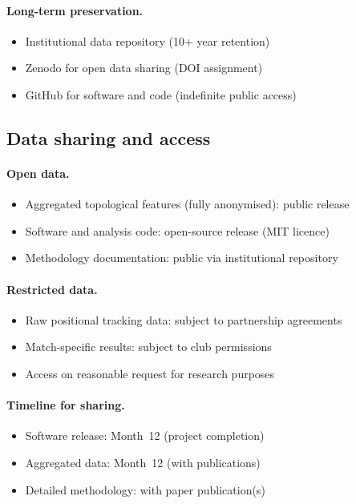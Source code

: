 \paragraph{Long-term preservation.}
\begin{itemize}
  \item Institutional data repository (10+ year retention)
  \item Zenodo for open data sharing (DOI assignment)
  \item GitHub for software and code (indefinite public access)
\end{itemize}

\subsection{Data sharing and access}

\paragraph{Open data.}
\begin{itemize}
  \item Aggregated topological features (fully anonymised): public release
  \item Software and analysis code: open-source release (MIT licence)
  \item Methodology documentation: public via institutional repository
\end{itemize}

\paragraph{Restricted data.}
\begin{itemize}
  \item Raw positional tracking data: subject to partnership agreements
  \item Match-specific results: subject to club permissions
  \item Access on reasonable request for research purposes
\end{itemize}

\paragraph{Timeline for sharing.}
\begin{itemize}
  \item Software release: Month~12 (project completion)
  \item Aggregated data: Month~12 (with publications)
  \item Detailed methodology: with paper publication(s)
\end{itemize}

